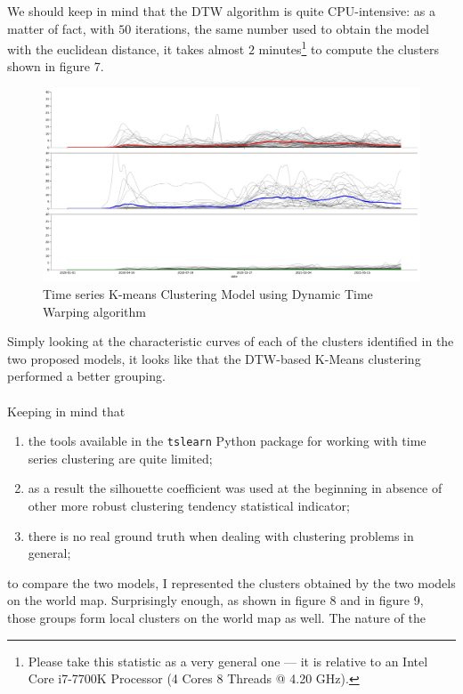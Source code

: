 \documentclass[11pt,a4paper]{article}
\begin{document}
We should keep in mind that the DTW algorithm is quite CPU-intensive: as a
matter of fact, with $50$ iterations, the same number used to obtain the model
with the euclidean distance, it takes almost $2$ minutes\footnote{Please take
this statistic as a very general one --- it is relative to an Intel Core
i7-7700K Processor (4 Cores 8 Threads @ 4.20 GHz).} to compute the clusters
shown in figure 7.
\begin{figure}[H]
    \begin{center}
        \includegraphics[scale=0.32]{img/daily-deaths-dtw-clusters.pdf}
    \end{center}
    \vspace{-0.3cm}
    \caption{Time series K-means Clustering Model using Dynamic Time Warping algorithm}
\end{figure}
\noindent
Simply looking at the characteristic curves of each of the clusters identified
in the two proposed models, it looks like that the DTW-based K-Means clustering
performed a better grouping.\\
\\
Keeping in mind that
\begin{enumerate}
    \item the tools available in the \texttt{tslearn} Python package for working
    with time series clustering are quite limited;
    \item as a result the silhouette coefficient was used at the beginning in
    absence of other more robust clustering tendency statistical indicator;
    \item there is no real ground truth when dealing with clustering problems in
    general;
\end{enumerate}
to compare the two models, I represented the clusters obtained by the two models
on the world map. Surprisingly enough, as shown in figure 8 and in figure 9,
those groups form local clusters on the world map as well. The nature of the
\end{document}
